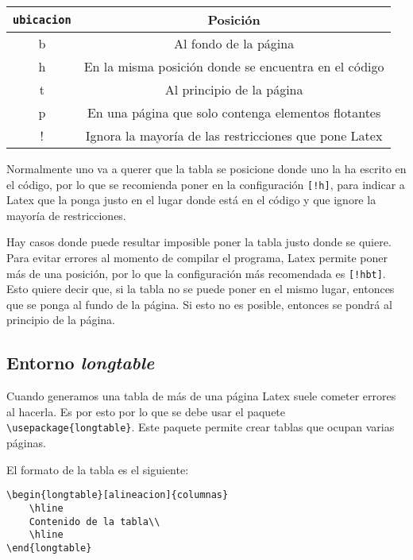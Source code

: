 	\begin{center}
		\begin{tabular}{|c|c|}
			\hline
			\verb|ubicacion| & Posición\\
			\hline
			b & Al fondo de la página\\
			\hline
			h & En la misma posición donde se encuentra en el código\\
			\hline
			t & Al principio de la página\\
			\hline
			p & En una página que solo contenga elementos flotantes\\
			\hline
			! & Ignora la mayoría de las restricciones que pone Latex \\
			\hline
		\end{tabular}
	\end{center}
	
	
	Normalmente uno va a querer que la tabla se posicione donde uno la ha escrito en el código, por lo que se recomienda poner en la configuración \verb|[!h]|, para indicar a Latex que la ponga justo en el lugar donde está en el código y que ignore la mayoría de restricciones.
	
	Hay casos donde puede resultar imposible poner la tabla justo donde se quiere. Para evitar errores al momento de compilar el programa, Latex permite poner más de una posición, por lo que la configuración más recomendada es \verb|[!hbt]|. Esto quiere decir que, si la tabla no se puede poner en el mismo lugar, entonces que se ponga al fundo de la página. Si esto no es posible, entonces se pondrá al principio de la página.
	
	\subsection{Entorno \textsl{longtable}}
	
	Cuando generamos una tabla de más de una página Latex suele cometer errores al hacerla. Es por esto por lo que se debe usar el paquete \verb|\usepackage{longtable}|. Este paquete permite crear tablas que ocupan varias páginas.
	
	El formato de la tabla es el siguiente:
	
	\begin{myquote}
		\begin{lstlisting}
\begin{longtable}[alineacion]{columnas}
	\hline
	Contenido de la tabla\\
	\hline
\end{longtable}			
		\end{lstlisting}		
	\end{myquote}
	
